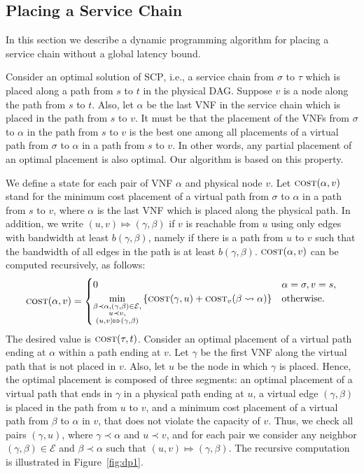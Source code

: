 \documentclass[11pt]{article}
\newcommand{\set}[1]{\left\{ #1 \right\}}
\newcommand{\scp}{\textsc{SCP}\xspace}
\newcommand{\calE}{\mathcal{E}}
\newcommand{\cost}{\textsc{cost}\xspace}
\begin{document}

\subsection{Placing a Service Chain}
\label{sec:chain-placement}

In this section we describe a dynamic programming algorithm for
placing a service chain without a global latency bound.  

Consider an optimal solution of \scp, i.e., a service chain from
$\sigma$ to $\tau$ which is placed along a path from $s$ to $t$ in the
physical DAG.  Suppose $v$ is a node along the path from $s$ to $t$.
Also, let $\alpha$ be the last VNF in the service chain which is
placed in the path from $s$ to $v$.  It must be that the placement of
the VNFs from $\sigma$ to $\alpha$ in the path from $s$ to $v$ is the
best one among all placements of a virtual path from $\sigma$ to
$\alpha$ in a path from $s$ to $v$.  In other words, any partial
placement of an optimal placement is also optimal.  Our algorithm is
based on this property.

We define a state for each pair of VNF $\alpha$ and physical node $v$.
Let $\cost(\alpha,v)$ stand for the minimum cost placement of a
virtual path from $\sigma$ to $\alpha$ in a path from $s$ to $v$,
where $\alpha$ is the last VNF which is placed along the physical
path.
%
In addition, we write $(u, v) \Mapsto (\gamma,\beta)$ if $v$ is
reachable from $u$ using only edges with bandwidth at least
$b(\gamma,\beta)$, namely if there is a path from $u$ to $v$ such that
the bandwidth of all edges in the path is at least $b(\gamma,\beta)$.
%
$\cost(\alpha,v)$ can be computed recursively, as follows:
\[
\cost(\alpha,v) =
\begin{cases}
0 & \alpha = \sigma, v = s, \\
\displaystyle
\min_{
  \substack{\beta \prec \alpha, (\gamma,\beta) \in \calE, \\
           u \prec v, \\
         (u,v) \Mapsto (\gamma,\beta)}
     }
  \set{\cost(\gamma,u) + \cost_v(\beta \leadsto \alpha)}
  & \text{otherwise}.
\end{cases}
\]
The desired value is $\cost(\tau,t)$.
%
Consider an optimal placement of a virtual path ending at $\alpha$
within a path ending at $v$.  Let $\gamma$ be the first VNF along the
virtual path that is not placed in $v$.  Also, let $u$ be the node in
which $\gamma$ is placed.  Hence, the optimal placement is composed of
three segments: an optimal placement of a virtual path that ends in
$\gamma$ in a physical path ending at $u$, a virtual edge
$(\gamma,\beta)$ is placed in the path from $u$ to $v$, and a minimum
cost placement of a virtual path from $\beta$ to $\alpha$ in $v$, that
does not violate the capacity of $v$.
%
Thus, we check all pairs $(\gamma,u)$, where $\gamma \prec \alpha$ and
$u \prec v$, and for each pair we consider any neighbor
$(\gamma,\beta) \in \calE$ and $\beta \prec \alpha$ such that $(u, v)
\Mapsto (\gamma,\beta)$.
%
The recursive computation is illustrated in Figure~\ref{fig:dp1}.
\end{document}
